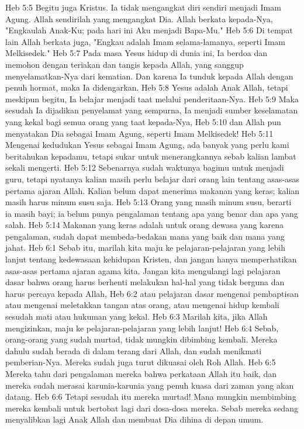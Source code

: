 Heb 5:5  Begitu juga Kristus. Ia tidak mengangkat diri sendiri menjadi Imam Agung. Allah sendirilah yang mengangkat Dia. Allah berkata kepada-Nya, "Engkaulah Anak-Ku; pada hari ini Aku menjadi Bapa-Mu."
Heb 5:6  Di tempat lain Allah berkata juga, "Engkau adalah Imam selama-lamanya, seperti Imam Melkisedek."
Heb 5:7  Pada masa Yesus hidup di dunia ini, Ia berdoa dan memohon dengan teriakan dan tangis kepada Allah, yang sanggup menyelamatkan-Nya dari kematian. Dan karena Ia tunduk kepada Allah dengan penuh hormat, maka Ia didengarkan.
Heb 5:8  Yesus adalah Anak Allah, tetapi meskipun begitu, Ia belajar menjadi taat melalui penderitaan-Nya.
Heb 5:9  Maka sesudah Ia dijadikan penyelamat yang sempurna, Ia menjadi sumber keselamatan yang kekal bagi semua orang yang taat kepada-Nya,
Heb 5:10  dan Allah pun menyatakan Dia sebagai Imam Agung, seperti Imam Melkisedek!
Heb 5:11  Mengenai kedudukan Yesus sebagai Imam Agung, ada banyak yang perlu kami beritahukan kepadamu, tetapi sukar untuk menerangkannya sebab kalian lambat sekali mengerti.
Heb 5:12  Sebenarnya sudah waktunya bagimu untuk menjadi guru, tetapi nyatanya kalian masih perlu belajar dari orang lain tentang asas-asas pertama ajaran Allah. Kalian belum dapat menerima makanan yang keras; kalian masih harus minum susu saja.
Heb 5:13  Orang yang masih minum susu, berarti ia masih bayi; ia belum punya pengalaman tentang apa yang benar dan apa yang salah.
Heb 5:14  Makanan yang keras adalah untuk orang dewasa yang karena pengalaman, sudah dapat membeda-bedakan mana yang baik dan mana yang jahat.
Heb 6:1  Sebab itu, marilah kita maju ke pelajaran-pelajaran yang lebih lanjut tentang kedewasaan kehidupan Kristen, dan jangan hanya memperhatikan asas-asas pertama ajaran agama kita. Jangan kita mengulangi lagi pelajaran dasar bahwa orang harus berhenti melakukan hal-hal yang tidak berguna dan harus percaya kepada Allah,
Heb 6:2  atau pelajaran dasar mengenai pembaptisan atau mengenai meletakkan tangan atas orang, atau mengenai hidup kembali sesudah mati atau hukuman yang kekal.
Heb 6:3  Marilah kita, jika Allah mengizinkan, maju ke pelajaran-pelajaran yang lebih lanjut!
Heb 6:4  Sebab, orang-orang yang sudah murtad, tidak mungkin dibimbing kembali. Mereka dahulu sudah berada di dalam terang dari Allah, dan sudah menikmati pemberian-Nya. Mereka sudah juga turut dikuasai oleh Roh Allah.
Heb 6:5  Mereka tahu dari pengalaman mereka bahwa perkataan Allah itu baik, dan mereka sudah merasai karunia-karunia yang penuh kuasa dari zaman yang akan datang.
Heb 6:6  Tetapi sesudah itu mereka murtad! Mana mungkin membimbing mereka kembali untuk bertobat lagi dari dosa-dosa mereka. Sebab mereka sedang menyalibkan lagi Anak Allah dan membuat Dia dihina di depan umum.
